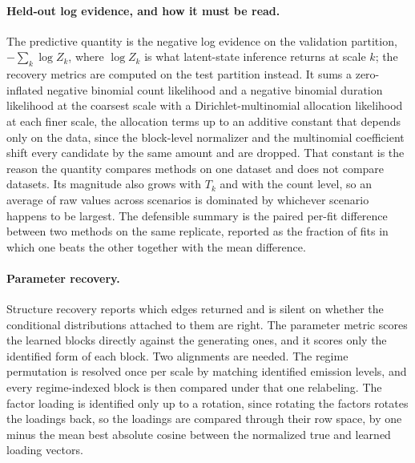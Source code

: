 \paragraph{Held-out log evidence, and how it must be read.}
The predictive quantity is the negative log evidence on the validation
partition, \(-\sum_k \log Z_k\), where \(\log Z_k\) is what latent-state
inference returns at scale \(k\); the recovery metrics are computed on the test
partition instead. It sums a zero-inflated negative binomial count likelihood
and a negative binomial duration likelihood at the coarsest scale with a
Dirichlet-multinomial allocation likelihood at each finer scale, the allocation
terms up to an additive constant that depends only on the data, since the
block-level normalizer and the multinomial coefficient shift every candidate by
the same amount and are dropped. That constant is the reason the quantity
compares methods on one dataset and does not compare datasets. Its
magnitude also grows with \(T_k\) and with the count level, so an average of
raw values across scenarios is dominated by whichever scenario happens to be
largest. The defensible summary is the paired per-fit difference between two
methods on the same replicate, reported as the fraction of fits in which one
beats the other together with the mean difference.

\paragraph{Parameter recovery.}
Structure recovery reports which edges returned and is silent on whether the
conditional distributions attached to them are right. The parameter metric
scores the learned blocks directly against the generating ones, and it scores
only the identified form of each block. Two alignments are needed. The regime
permutation is resolved once per scale by matching identified emission levels,
and every regime-indexed block is then compared under that one relabeling. The
factor loading is identified only up to a rotation, since rotating the factors
rotates the loadings back, so the loadings are compared through their row
space, by one minus the mean best absolute cosine between the normalized true
and learned loading vectors.

